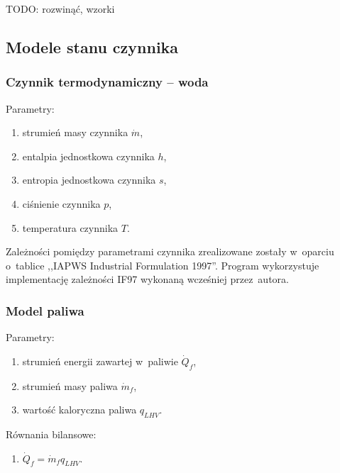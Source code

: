 TODO: rozwinąć, wzorki


\subsection{Modele stanu czynnika}

\subsubsection{Czynnik termodynamiczny -- woda}

Parametry:

\begin{enumerate}

	\item strumień masy czynnika $\dot m$,

	\item entalpia jednostkowa czynnika $h$,

	\item entropia jednostkowa czynnika $s$,

	\item ciśnienie czynnika $p$,

	\item temperatura czynnika $T$.

\end{enumerate}

Zależności pomiędzy parametrami czynnika zrealizowane zostały w~oparciu
o~tablice ,,IAPWS Industrial Formulation 1997''. Program wykorzystuje
implementację zależności IF97 wykonaną wcześniej przez~autora.


\subsubsection{Model paliwa}

Parametry:

\begin{enumerate}

	\item strumień energii zawartej w~paliwie $\dot Q_f$,

	\item strumień masy paliwa $\dot m_f$,

	\item wartość kaloryczna paliwa $q_{LHV}$.

\end{enumerate}

Równania bilansowe:

\begin{enumerate}

	\item $\dot Q_f = \dot m_f q_{LHV}$.

\end{enumerate}


